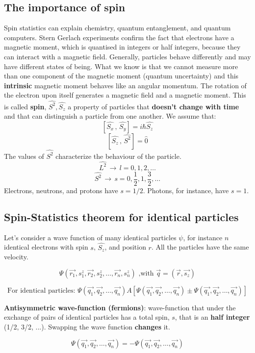 	\subsection{The importance of spin}
	Spin statistics can explain chemistry, quantum entanglement, and quantum computers.
	Stern Gerlach experiments confirm the fact that electrons have a magnetic moment, which is quantised in integers or half integers, because they can interact with a magnetic field.
Generally, particles behave differently and may have different states of being.
	What we know is that we cannot measure more than one component of the magnetic moment (quantum uncertainty) and this \textbf{intrinsic} magnetic moment behaves like an angular momentum.
	The rotation of the electron upon itself generates a magnetic field and a magnetic moment.
This is called \textbf{spin}, $\hat{S^2},\hat{S_z}$ a property of particles that \textbf{doesn't change with time} and that can distinguish a particle from one another.
	\newline
	We assume that:
	\[ [\hat{S_x}\,,\,\hat{S_y}]=i\hbar\hat{S_z} \]
	\[ [\hat{S_z}\,,\,\hat{S^2}]=\hat{0} \]
	The values of $\hat{S^2}$ characterize the behaviour of the particle.
	$$\hat{L^2}\,\rightarrow\,l=0, 1, 2, \dots$$
	$$\hat{S^2}\,\rightarrow\,s=0, \frac{1}{2}, 1, \frac{3}{2}, \dots$$
	Electrons, neutrons, and protons have $s=1/2$.
Photons, for instance, have $s=1$.

	\subsection{Spin-Statistics theorem for identical particles}
	Let's consider a wave function of many identical particles $\psi$, for instance $n$ identical electrons with spin $s$, $\hat{S_z}$, and position $r$.
All the particles have the same velocity.

	$$\Psi(\vec{r_1}, s_1^z, \vec{r_2}, s_2^z, \dots, \vec{r_n}, s_n^z) \text{ ,with } \vec{q}=(\vec{r},\vec{s_z})$$

	$$\text{For identical particles: }\Psi(\vec{q_1},\vec{q_2}, \dots, \vec{q_n})A[\Psi(\vec{q_1},\vec{q_2}, \dots, \vec{q_n})\pm\Psi(\vec{q_1},\vec{q_2}, \dots, \vec{q_n})]$$

	\textbf{Antisymmetric wave-function (fermions)}: wave-function that under the exchange of pairs of identical particles has a total spin, $s$, that is an \textbf{half integer} (1/2, 3/2, ...).
Swapping the wave function \textbf{changes} it.

	$$\Psi(\vec{q_1},\vec{q_2}, \dots, \vec{q_n})=-\Psi(\vec{q_1},\vec{q_2}, \dots, \vec{q_n})$$

